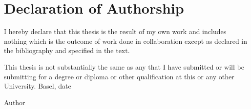 \chapter*{Declaration of Authorship}
\label{DeclarationOfAuthorship}

I hereby declare that this thesis is the result of my own work and includes nothing which is the outcome of work done in collaboration except as declared in the bibliography and specified in the text.

This thesis is not substantially the same as any that I have submitted or will be submitting for a degree or diploma or other qualification at this or any other University.
\newline
\newline
\newline
\newline
Basel, date
\newline
\newline
\begin{flushright}
Author
\end{flushright}

